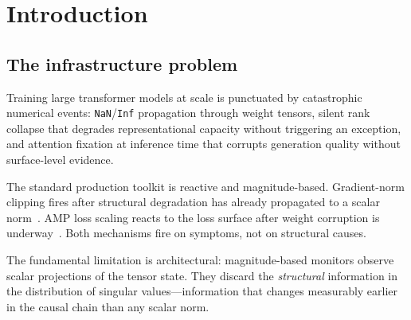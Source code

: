 \documentclass[11pt,a4paper]{article}
\theoremstyle{plain}
\begin{document}
\begin{abstract}
All results are bounded, reproducible, and accompanied by exact
measurement protocols. The reference implementation is released as
an Apache 2.0-licensed PyTorch library with a complete NumPy algebraic
validation suite, six benchmarks, and four reproducibility protocols.
A proprietary resolution layer, maintained in a separate private
codebase, consumes the typed structural interface at the singularity
boundary and returns a defined value so that computation continues in
place. Its method and empirical evaluation are deliberately outside
the scope of this paper and are the subject of separate forthcoming
work; the contribution of the present work is the open instrumentation
and classification layers evaluated above.
\end{abstract}

\tableofcontents
\newpage


\section{Introduction}
\label{sec:intro}

\subsection{The infrastructure problem}

Training large transformer models at scale is punctuated by catastrophic
numerical events: \texttt{NaN}/\texttt{Inf} propagation through weight
tensors, silent rank collapse that degrades representational capacity
without triggering an exception, and attention fixation at inference
time that corrupts generation quality without surface-level evidence.

The standard production toolkit is reactive and magnitude-based.
Gradient-norm clipping fires after structural degradation has already
propagated to a scalar norm~\citep{goodfellow2016deep}.
AMP loss scaling reacts to the loss surface after weight corruption is
underway~\citep{micikevicius2018mixed}.
Both mechanisms fire on symptoms, not on structural causes.

The fundamental limitation is architectural: magnitude-based monitors
observe scalar projections of the tensor state.
They discard the \emph{structural} information in the distribution of
singular values---information that changes measurably earlier in the
causal chain than any scalar norm.
\end{document}
